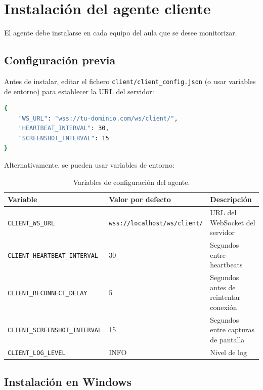 \documentclass[12pt,a4paper]{article}
\begin{document}
\section{Instalación del agente cliente}

El agente debe instalarse en cada equipo del aula que se desee monitorizar.

\subsection{Configuración previa}

Antes de instalar, editar el fichero \texttt{client/client\_config.json} (o usar variables de entorno) para establecer la URL del servidor:

\begin{lstlisting}[language=bash,title={client\_config.json}]
{
    "WS_URL": "wss://tu-dominio.com/ws/client/",
    "HEARTBEAT_INTERVAL": 30,
    "SCREENSHOT_INTERVAL": 15
}
\end{lstlisting}

Alternativamente, se pueden usar variables de entorno:

\begin{table}[H]
\centering
\begin{tabularx}{\textwidth}{llX}
    \toprule
    \textbf{Variable} & \textbf{Valor por defecto} & \textbf{Descripción} \\
    \midrule
    \texttt{CLIENT\_WS\_URL}              & \texttt{wss://localhost/ws/client/} & URL del WebSocket del servidor \\
    \texttt{CLIENT\_HEARTBEAT\_INTERVAL}  & 30         & Segundos entre heartbeats \\
    \texttt{CLIENT\_RECONNECT\_DELAY}     & 5          & Segundos antes de reintentar conexión \\
    \texttt{CLIENT\_SCREENSHOT\_INTERVAL} & 15         & Segundos entre capturas de pantalla \\
    \texttt{CLIENT\_LOG\_LEVEL}           & INFO       & Nivel de log \\
    \bottomrule
\end{tabularx}
\caption{Variables de configuración del agente.}
\end{table}

\subsection{Instalación en Windows}
\end{document}
